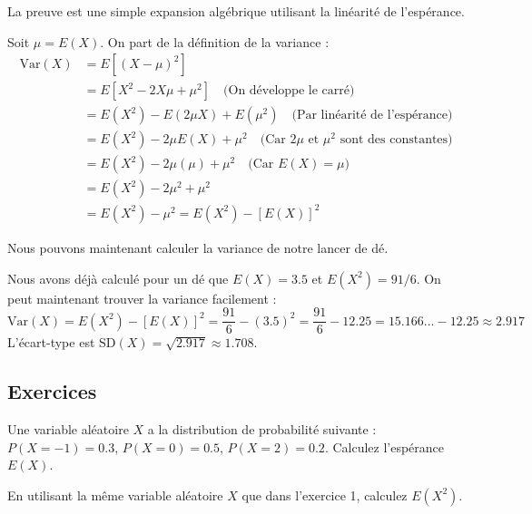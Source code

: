 La preuve est une simple expansion algébrique utilisant la linéarité de l'espérance.

\begin{proofbox}
Soit $\mu = E(X)$. On part de la définition de la variance :
\begin{align*}
\text{Var}(X) &= E[ (X - \mu)^2 ] \\
&= E[ X^2 - 2X\mu + \mu^2 ] \quad \text{(On développe le carré)} \\
&= E(X^2) - E(2\mu X) + E(\mu^2) \quad \text{(Par linéarité de l'espérance)} \\
&= E(X^2) - 2\mu E(X) + \mu^2 \quad \text{(Car $2\mu$ et $\mu^2$ sont des constantes)} \\
&= E(X^2) - 2\mu(\mu) + \mu^2 \quad \text{(Car $E(X) = \mu$)} \\
&= E(X^2) - 2\mu^2 + \mu^2 \\
&= E(X^2) - \mu^2 = E(X^2) - [E(X)]^2
\end{align*}
\end{proofbox}

Nous pouvons maintenant calculer la variance de notre lancer de dé.

\begin{examplebox}
Nous avons déjà calculé pour un dé que $E(X) = 3.5$ et $E(X^2) = 91/6$. On peut maintenant trouver la variance facilement :
$$ \text{Var}(X) = E(X^2) - [E(X)]^2 = \frac{91}{6} - (3.5)^2 = \frac{91}{6} - 12.25 = 15.166... - 12.25 \approx 2.917 $$
L'écart-type est $\text{SD}(X) = \sqrt{2.917} \approx 1.708$.
\end{examplebox}

\subsection{Exercices}


\begin{exercicebox}
Une variable aléatoire $X$ a la distribution de probabilité suivante :
$P(X=-1) = 0.3$, $P(X=0) = 0.5$, $P(X=2) = 0.2$.
Calculez l'espérance $E(X)$.
\end{exercicebox}

\begin{exercicebox}
En utilisant la même variable aléatoire $X$ que dans l'exercice 1, calculez $E(X^2)$.
\end{exercicebox}

